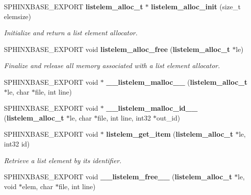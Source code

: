 \begin{DoxyCompactItemize}
\item 
S\+P\+H\+I\+N\+X\+B\+A\+S\+E\+\_\+\+E\+X\+P\+O\+R\+T {\bf listelem\+\_\+alloc\+\_\+t} $\ast$ {\bf listelem\+\_\+alloc\+\_\+init} (size\+\_\+t elemsize)\label{listelem__alloc_8h_a4b08b49eaa74cbe9a3c95170cee78de7}

\begin{DoxyCompactList}\small\item\em Initialize and return a list element allocator. \end{DoxyCompactList}\item 
S\+P\+H\+I\+N\+X\+B\+A\+S\+E\+\_\+\+E\+X\+P\+O\+R\+T void {\bf listelem\+\_\+alloc\+\_\+free} ({\bf listelem\+\_\+alloc\+\_\+t} $\ast$le)\label{listelem__alloc_8h_a94c02e93a0abaa2bd79636cbac6cced2}

\begin{DoxyCompactList}\small\item\em Finalize and release all memory associated with a list element allocator. \end{DoxyCompactList}\item 
S\+P\+H\+I\+N\+X\+B\+A\+S\+E\+\_\+\+E\+X\+P\+O\+R\+T void $\ast$ {\bfseries \+\_\+\+\_\+listelem\+\_\+malloc\+\_\+\+\_\+} ({\bf listelem\+\_\+alloc\+\_\+t} $\ast$le, char $\ast$file, int line)\label{listelem__alloc_8h_a04e5512f4dcedc2e84e58108bf61f1ff}

\item 
S\+P\+H\+I\+N\+X\+B\+A\+S\+E\+\_\+\+E\+X\+P\+O\+R\+T void $\ast$ {\bfseries \+\_\+\+\_\+listelem\+\_\+malloc\+\_\+id\+\_\+\+\_\+} ({\bf listelem\+\_\+alloc\+\_\+t} $\ast$le, char $\ast$file, int line, int32 $\ast$out\+\_\+id)\label{listelem__alloc_8h_a45f35edbe5f23773b1624f2ca2ac5e86}

\item 
S\+P\+H\+I\+N\+X\+B\+A\+S\+E\+\_\+\+E\+X\+P\+O\+R\+T void $\ast$ {\bf listelem\+\_\+get\+\_\+item} ({\bf listelem\+\_\+alloc\+\_\+t} $\ast$le, int32 id)\label{listelem__alloc_8h_a74e610ac90e2b0696b2aedef4289d8f3}

\begin{DoxyCompactList}\small\item\em Retrieve a list element by its identifier. \end{DoxyCompactList}\item 
S\+P\+H\+I\+N\+X\+B\+A\+S\+E\+\_\+\+E\+X\+P\+O\+R\+T void {\bf \+\_\+\+\_\+listelem\+\_\+free\+\_\+\+\_\+} ({\bf listelem\+\_\+alloc\+\_\+t} $\ast$le, void $\ast$elem, char $\ast$file, int line)\label{listelem__alloc_8h_ab83a7a6fd086c14140ad2c8c4162709b}


\end{DoxyCompactItemize}
